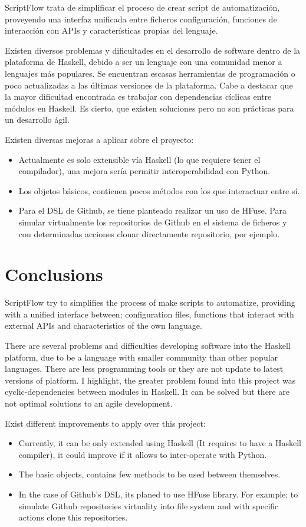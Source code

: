 \documentclass[11pt]{article}
\begin{document}
ScriptFlow trata de simplificar el proceso de crear script de automatización, proveyendo una interfaz unificada entre ficheros
configuración, funciones de interacción con APIs y características propias del lenguaje.

Existen diversos problemas y dificultades en el desarrollo de software dentro de la plataforma de Haskell, debido a ser un lenguaje
con una comunidad menor a lenguajes más populares. Se encuentran escasas herramientas de programación o poco actualizadas a las últimas versiones de la plataforma.
Cabe a destacar que la mayor dificultad encontrada es trabajar con dependencias cíclicas entre módulos en Haskell. Es cierto, que existen soluciones pero
no son prácticas para un desarrollo ágil.

Existen diversas mejoras a aplicar sobre el proyecto:
\begin{itemize}
\item Actualmente es solo extensible vía Haskell (lo que requiere tener el compilador), una mejora sería permitir interoperabilidad con Python.
\item Los objetos básicos, contienen pocos métodos con los que interactuar entre sí.
\item Para el DSL de Github, se tiene planteado realizar un uso de HFuse. Para simular virtualmente los repositorios de Github en el sistema de ficheros
y con determinadas acciones clonar directamente repositorio, por ejemplo.
\end{itemize}

\section{Conclusions}
\label{sec:org3f1753d}

ScriptFlow try to simplifies the process of make scripts to automatize, providing with a unified interface between; configuration files, functions that interact with external APIs and
characteristics of the own language.

There are several problems and difficulties developing software into the Haskell platform, due to be a language with smaller community than other popular languages. There are less programming
tools or they are not update to latest versions of platform. I highlight, the greater problem found into this project was cyclic-dependencies between modules in Haskell. It can be solved but there are not optimal
solutions to an agile development.

Exist different improvements to apply over this project:
\begin{itemize}
\item Currently, it can be only extended using Haskell (It requires to have a Haskell compiler), it could improve if it allows to inter-operate with Python.
\item The basic objects, contains few methods to be used between themselves.
\item In the case of Github's DSL, its planed to use HFuse library. For example; to simulate Github repositories virtuality into file system and with specific actions clone this repositories.
\end{itemize}
\end{document}
